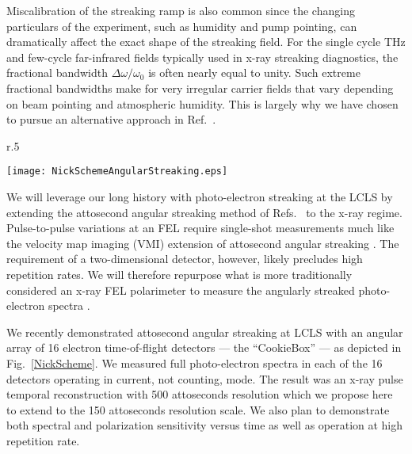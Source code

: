 \documentclass[letterpaper,oneside,11pt]{article}
\begin{document}
Miscalibration of the streaking ramp is also common since the changing particulars of the experiment, such as humidity and pump pointing, can dramatically affect the exact shape of the streaking field.
For the single cycle THz and few-cycle far-infrared fields typically used in x-ray streaking diagnostics, the fractional bandwidth $\Delta\omega/\omega_0$ is often nearly equal to unity.
Such extreme fractional bandwidths make for very irregular carrier fields that vary depending on beam pointing and atmospheric humidity.
This is largely why we have chosen to pursue an alternative approach in Ref.~\cite{Nick2016}.

\begin{wrapfigure}[15]{r}{.5\linewidth}
\centerline{\texttt{[image: NickSchemeAngularStreaking.eps]}}
\vspace{-.5\baselineskip}
\caption{\label{NickScheme}
Angular streaking schematic.
}
\end{wrapfigure}

We will leverage our long history with photo-electron streaking at the LCLS \cite{Duesterer11,Meyer12,Helml2014} by extending the attosecond angular streaking method of Refs.~\cite{CorkumAngularStreaking,KellerAngularStreaking} to the x-ray regime.
Pulse-to-pulse variations at an FEL require single-shot measurements much like the velocity map imaging (VMI) \cite{VrakkingRSI} extension of attosecond angular streaking \cite{attoclockVMI2013}.
The requirement of a two-dimensional detector, however, likely precludes high repetition rates. 
We will therefore repurpose what is more traditionally considered an x-ray FEL polarimeter \cite{Markus2014,Allaria2014,Mazza2014,Lutman2016} to measure the angularly streaked photo-electron spectra \cite{Markus2014,Allaria2014,Mazza2014,Lutman2016}.

We recently demonstrated attosecond angular streaking at LCLS with an angular array of 16 electron time-of-flight detectors --- the ``CookieBox'' --- as depicted in Fig.~\ref{NickScheme}.
We measured full photo-electron spectra in each of the 16 detectors operating in current, not counting, mode.
The result was an x-ray pulse temporal reconstruction with 500 attoseconds resolution \cite{Nick2016} which we propose here to extend to the 150 attoseconds resolution scale.
We also plan to demonstrate both spectral and polarization sensitivity versus time as well as operation at high repetition rate.
\end{document}
